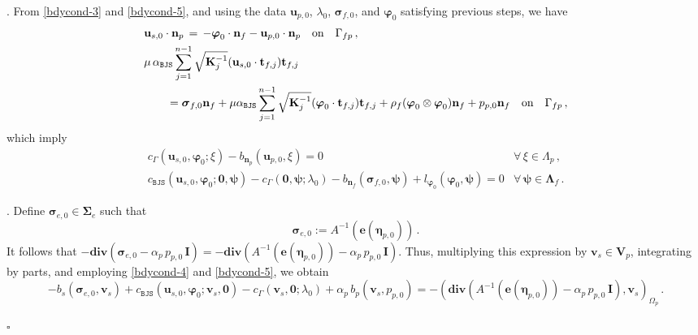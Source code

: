 \documentclass[11pt]{article}
\numberwithin{equation}{section}
\newcommand{\bLambda}{{\boldsymbol\Lambda}}
\newcommand{\bbeta}{{\boldsymbol\eta}}
\newcommand{\bsi}{{\boldsymbol\sigma}}
\newcommand{\bSigma}{{\boldsymbol\Sigma}}
\newcommand{\bvarphi}{{\boldsymbol\varphi}}
\newcommand{\bpsi}{{\boldsymbol\psi}}
\newcommand{\bv}{{\mathbf{v}}}
\newcommand{\bu}{\mathbf{u}}
\newcommand{\bt}{{\mathbf{t}}}
\newcommand{\bn}{{\mathbf{n}}}
\newcommand{\be}{{\mathbf{e}}}
\newcommand{\0}{{\mathbf{0}}}
\def\bK{\mathbf{K}}
\def\bI{\mathbf{I}}
\def\bV{\mathbf{V}}
\def\BJS{\mathtt{BJS}}
\def\bdiv{\mathbf{div}}
\def\qon{{\quad\hbox{on}\quad}}
\newenvironment{proof}{\noindent{\it Proof.}}{\hfill$\square$}
\numberwithin{equation}{section}
\begin{document}
\begin{proof}
. From \eqref{bdycond-3} and \eqref{bdycond-5}, and using the data $\bu_{p,0}$, $\lambda_{0}$, $\bsi_{f,0}$, and $\bvarphi_0$ satisfying previous steps, we have
%
\begin{align*}
& \bu_{s,0}\cdot\bn_p \,=\, -\bvarphi_0\cdot\bn_f - \bu_{p,0}\cdot\bn_p \qon \Gamma_{fp}\,, \nonumber\\ 
& \mu\,\alpha_{\BJS}\sum^{n-1}_{j=1} \sqrt{\bK^{-1}_j}(\bu_{s,0}\cdot\bt_{f,j})\bt_{f,j} \nonumber\\ 
& \qquad
= \bsi_{f,0}\bn_f + \mu\alpha_{\BJS}\sum^{n-1}_{j=1} \sqrt{\bK^{-1}_j}(\bvarphi_0\cdot\bt_{f,j})\bt_{f,j}+ \rho_f(\bvarphi_0\otimes \bvarphi_0)\bn_f
+ p_{p,0}\bn_f \qon \Gamma_{fp}\,,
\end{align*}
%
which imply
\begin{equation}\label{eq:system-sol0-3}
\begin{array}{ll}
c_{\Gamma}(\bu_{s,0},\bvarphi_0;\xi) - b_{\bn_p}(\bu_{p,0},\xi) = 0 & \forall\,\xi\in \Lambda_p\,, \\[2ex]
c_{\BJS}(\bu_{s,0},\bvarphi_0;\0,\bpsi) - c_{\Gamma}(\0,\bpsi;\lambda_0) - b_{\bn_f}(\bsi_{f,0},\bpsi) +l_{\bvarphi_0}(\bvarphi_0,\bpsi)= 0 & \forall\,\bpsi\in \bLambda_{f} \,.
\end{array}
\end{equation}

. Define $\bsi_{e,0} \in \bSigma_e$ such that
\begin{equation}\label{eq:system-sol0-4}
\bsi_{e,0} := A^{-1}(\be(\bbeta_{p,0}))\,.
\end{equation}
%
It follows that $- \bdiv(\bsi_{e,0} - \alpha_p\,p_{p,0}\,\bI)
= - \bdiv(A^{-1}(\be(\bbeta_{p,0})) - \alpha_p\,p_{p,0}\,\bI)$.
Thus, multiplying this expression by $\bv_s \in \bV_p$, integrating by parts, and employing \eqref{bdycond-4} and \eqref{bdycond-5}, we obtain
\begin{equation}\label{eq:system-sol0-4a}
-b_s(\bsi_{e,0},\bv_s)  + c_{\BJS}(\bu_{s,0},\bvarphi_0;\bv_s,\0) - c_{\Gamma}(\bv_s,\0;\lambda_0) + \alpha_p\,b_p(\bv_s,p_{p,0}) = -(\bdiv(A^{-1}(\be(\bbeta_{p,0})) - \alpha_p\,p_{p,0}\,\bI),\bv_s)_{\Omega_p}\,.
\end{equation}


\end{proof}
\end{document}

